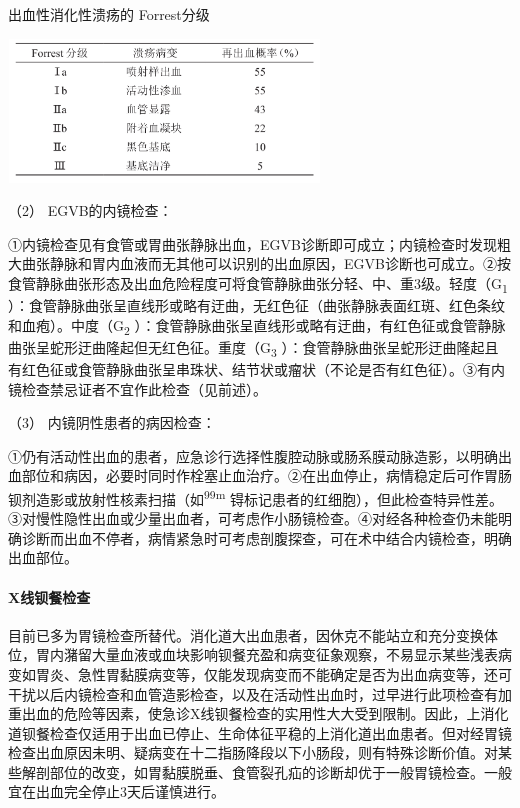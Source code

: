 \begin{table}[htbp]
\centering
\caption{出血性消化性溃疡的 Forrest分级}
\label{tab13-3}
\includegraphics[width=3.26042in,height=1.5in]{./images/Image00055.jpg}
\end{table}

\hypertarget{text00032.htmlux5cux23CHP1-13-1-4-4-2-2}{}
（2） EGVB的内镜检查：

①内镜检查见有食管或胃曲张静脉出血，EGVB诊断即可成立；内镜检查时发现粗大曲张静脉和胃内血液而无其他可以识别的出血原因，EGVB诊断也可成立。②按食管静脉曲张形态及出血危险程度可将食管静脉曲张分轻、中、重3级。轻度（G\textsubscript{1}
）：食管静脉曲张呈直线形或略有迂曲，无红色征（曲张静脉表面红斑、红色条纹和血疱）。中度（G\textsubscript{2}
）：食管静脉曲张呈直线形或略有迂曲，有红色征或食管静脉曲张呈蛇形迂曲隆起但无红色征。重度（G\textsubscript{3}
）：食管静脉曲张呈蛇形迂曲隆起且有红色征或食管静脉曲张呈串珠状、结节状或瘤状（不论是否有红色征）。③有内镜检查禁忌证者不宜作此检查（见前述）。

\hypertarget{text00032.htmlux5cux23CHP1-13-1-4-4-2-3}{}
（3） 内镜阴性患者的病因检查：

①仍有活动性出血的患者，应急诊行选择性腹腔动脉或肠系膜动脉造影，以明确出血部位和病因，必要时同时作栓塞止血治疗。②在出血停止，病情稳定后可作胃肠钡剂造影或放射性核素扫描（如\textsuperscript{99m}
锝标记患者的红细胞），但此检查特异性差。③对慢性隐性出血或少量出血者，可考虑作小肠镜检查。④对经各种检查仍未能明确诊断而出血不停者，病情紧急时可考虑剖腹探查，可在术中结合内镜检查，明确出血部位。

\paragraph{X线钡餐检查}

目前已多为胃镜检查所替代。消化道大出血患者，因休克不能站立和充分变换体位，胃内潴留大量血液或血块影响钡餐充盈和病变征象观察，不易显示某些浅表病变如胃炎、急性胃黏膜病变等，仅能发现病变而不能确定是否为出血病变等，还可干扰以后内镜检查和血管造影检查，以及在活动性出血时，过早进行此项检查有加重出血的危险等因素，使急诊X线钡餐检查的实用性大大受到限制。因此，上消化道钡餐检查仅适用于出血已停止、生命体征平稳的上消化道出血患者。但对经胃镜检查出血原因未明、疑病变在十二指肠降段以下小肠段，则有特殊诊断价值。对某些解剖部位的改变，如胃黏膜脱垂、食管裂孔疝的诊断却优于一般胃镜检查。一般宜在出血完全停止3天后谨慎进行。

